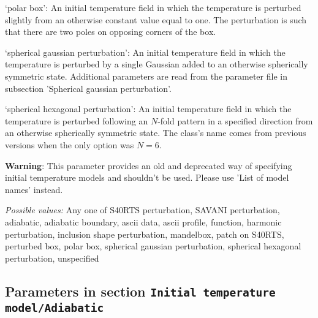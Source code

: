 \begin{itemize}
`polar box': An initial temperature field in which the temperature is perturbed slightly from an otherwise constant value equal to one. The perturbation is such that there are two poles on opposing corners of the box. 

`spherical gaussian perturbation': An initial temperature field in which the temperature is perturbed by a single Gaussian added to an otherwise spherically symmetric state. Additional parameters are read from the parameter file in subsection 'Spherical gaussian perturbation'.

`spherical hexagonal perturbation': An initial temperature field in which the temperature is perturbed following an $N$-fold pattern in a specified direction from an otherwise spherically symmetric state. The class's name comes from previous versions when the only option was $N=6$.

\textbf{Warning}: This parameter provides an old and deprecated way of specifying initial temperature models and shouldn't be used. Please use 'List of model names' instead.


{\it Possible values:} Any one of S40RTS perturbation, SAVANI perturbation, adiabatic, adiabatic boundary, ascii data, ascii profile, function, harmonic perturbation, inclusion shape perturbation, mandelbox, patch on S40RTS, perturbed box, polar box, spherical gaussian perturbation, spherical hexagonal perturbation, unspecified
\end{itemize}



\subsection{Parameters in section \tt Initial temperature model/Adiabatic}
\label{parameters:Initial_20temperature_20model/Adiabatic}

